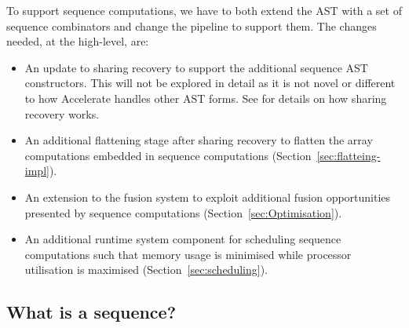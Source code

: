 To support sequence computations, we have to both extend the AST with a set of sequence combinators and change the pipeline to support them. The changes needed, at the high-level, are:
%
\begin{itemize}
%
\item An update to sharing recovery to support the additional sequence AST constructors. This will not be explored in detail as it is not novel or different to how Accelerate handles other AST forms. See \citet{McDonell:acc-optim} for details on how sharing recovery works.
%
\item An additional flattening stage after sharing recovery to flatten the array computations embedded in sequence computations (Section~\ref{sec:flatteing-impl}).
%
\item An extension to the fusion system to exploit additional fusion opportunities presented by sequence computations (Section~\ref{sec:Optimisation}).
%
\item An additional runtime system component for scheduling sequence computations such that memory usage is minimised while processor utilisation is maximised (Section~\ref{sec:scheduling}).
%
\end{itemize}



\subsection{What is a sequence?}

